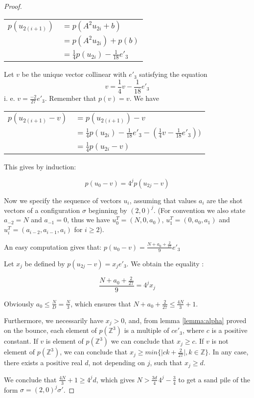 \documentclass[11pt,a4paper]{llncs}
\begin{document}
\begin{proof}
\begin{center}
 \begin{tabular}{rl}
   $p(u_{2(i+1)})$ & $= p(A^2u_{2i}+b)$\\
    & $= p(A^2u_{2i}) + p(b)$\\
    & $= \frac{1}{4}p(u_{2i}) - \frac{1}{18}e'_3$
 \end{tabular}
\end{center}
Let $v$ be the unique vector collinear with $e'_3$ satisfying the equation
\[
 v=\frac{1}{4}v - \frac{1}{18}e'_3
\]
i. e.  $v=  \frac{-2}{27}e'_3$.  Remember that $p(v) = v$. We have
\begin{center}
 \begin{tabular}{rl}
   $p(u_{2(i+1)}-v)$ & $= p(u_{2(i+1)}) - v$\\
    & $= \frac{1}{4}p(u_{2i}) - \frac{1}{18}e'_3 -(\frac{1}{4}v - \frac{1}{18}e'_3) )$\\
    & $= \frac{1}{4}p(u_{2i}-v)$

 \end{tabular}
\end{center}
This gives by induction: 

$$ p(u_0 - v)  = 4^j p(u_{2j}-v)$$

Now we specify the sequence of vectors $u_i$,  assuming that values $a_i$ are the shot vectors of a configuration $\sigma $ beginning by $(2,0)^j$.
 (For convention we also  state $a_{-2}=N$ and $a_{-1}=0$, thus we have $u_0^T = (N, 0, a_0)$, $u_1^T = (0, a_0, a_1)$ and $u_i^T =(a_{i-2},a_{i-1},a_i)$ for $i \geq 2$).

 An easy computation gives that:  
 $p(u_0 - v) = \frac{N+ a_0 + \frac{2}{27}}{9}e'_3 $

 Let $x_j$ be defined by $p(u_{2j}-v) = x_j e'_3$. We obtain   the equality :

$$ \frac{N+ a_0 + \frac{2}{27}}{9} =  4^j x_j$$

Obviously $a_0 \leq \frac{N}{D} = \frac{N}{3}$, which ensures that  $N+ a_0 + \frac{2}{27}\leq \frac{4N}{3}  +1$.

Furthermore,  we necessarily have $x_j >0$, and, from lemma \ref{lemma:alpha} proved on the bounce, each element of $p(\mathbb Z^3)$ is a multiple of $c e'_3$, where $c$ is a positive constant.
If $v$  is element of  $p(\mathbb Z^3)$ we can conclude that $x_j \geq c.$
If $v$  is not element of  $p(\mathbb Z^3)$,  we can conclude that $x_j \geq   min\{ \vert ck + \frac{2}{27}\vert , k \in \mathbb{Z}  \}$. In any case,  there exists a positive real $d$, not depending on $j$,   such that  $x_j \geq d.$


We conclude that $\frac{4N}{3}  +1 \geq  4^j d $, which gives $N>  \frac{3d }{4} \,4^j -\frac{3 }{4} $ to get a sand pile of the form $\sigma=(2,0)^j\sigma'$.
\end{proof}
\end{document}
